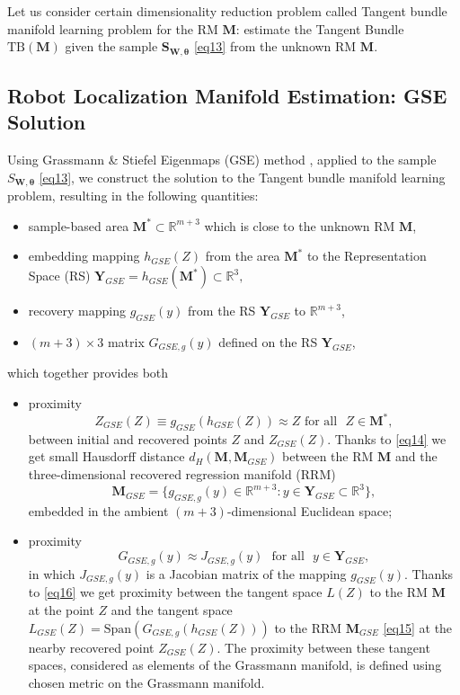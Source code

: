 \documentclass[conference]{IEEEtran} %
\def\mbtheta{{\bm\theta}}
\def\mbM{\mathbf{M}}
\def\mbY{\mathbf{Y}}
\def\mbS{\mathbf{S}}
\def\RR{\mathbb{R}}
\begin{document}
Let us consider certain dimensionality reduction problem called Tangent bundle manifold learning problem \cite{bib26} for the RM $\mbM$: estimate the Tangent Bundle $\mathrm{TB}(\mbM)$ given the sample $\mbS_{\mathbf{W},\mbtheta}$ \eqref{eq13} from the unknown RM $\mbM$.

\subsection{Robot Localization Manifold Estimation: GSE Solution}
\label{sec4.2}

Using Grassmann \& Stiefel Eigenmaps (GSE) method \cite{bib21,bib22}, applied to the sample $S_{\mathbf{W},\mbtheta}$ \eqref{eq13}, we construct the solution to the Tangent bundle manifold learning problem, resulting in the following quantities:
\begin{itemize}
	\item
    	sample-based area $\mbM^* \subset \RR^{m+3}$ which is close to the unknown RM $\mbM$,
      \item
      	embedding mapping $h_{GSE}(Z)$ from the area $\mbM^*$ to the Representation Space (RS) $\mbY_{GSE} = h_{GSE}(\mbM^*)\subset\RR^3,$
  \item
  	recovery mapping $g_{GSE}(y)$ from the RS $\mbY_{GSE}$ to $\RR^{m+3}$,
  \item
  	$(m+3)\times 3$ matrix $G_{GSE,g}(y)$ defined on the RS $\mbY_{GSE}$,
\end{itemize}
which together provides both
\begin{itemize}
\item proximity
\begin{equation}
\label{eq14}
	Z_{GSE}(Z) \equiv g_{GSE}(h_{GSE}(Z)) \approx Z\,\,\mbox{for all }\,\,Z \in \mbM^*,
\end{equation}
between initial and recovered points $Z$ and $Z_{GSE}(Z)$. Thanks to \eqref{eq14} we get small Hausdorff distance $d_H(\mbM, \mbM_{GSE})$ between the RM $\mbM$ and the three-dimensional recovered regression manifold (RRM)
\begin{equation}
\label{eq15}
	\mbM_{GSE} = \{g_{GSE,g}(y) \in \RR^{m+3}: y \in \mbY_{GSE}\subset\RR^3\},
 \end{equation}
embedded in the ambient $(m+3)$-dimensional Euclidean space;
\item proximity
\begin{equation}
\label{eq16}
	G_{GSE,g}(y) \approx J_{GSE,g}(y)\,\,\mbox{ for all }\,\, y \in \mbY_{GSE},
\end{equation}
in which $J_{GSE,g}(y)$ is a Jacobian matrix of the mapping $g_{GSE}(y)$. Thanks to \eqref{eq16} we get proximity between the tangent space $L(Z)$ to the RM $\mbM$ at the point $Z$ and the tangent space $L_{GSE}(Z) = \mathrm{Span}(G_{GSE,g}(h_{GSE}(Z)))$ to the RRM $\mbM_{GSE}$ \eqref{eq15} at the nearby recovered point $Z_{GSE}(Z)$. The proximity between these tangent spaces, considered as elements of the Grassmann manifold, is defined using chosen metric on the Grassmann manifold.
\end{itemize}
\end{document}
